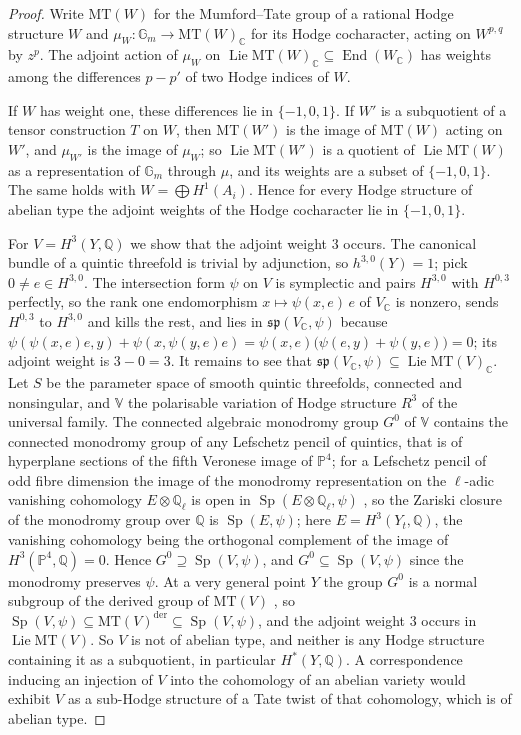 \documentclass[11pt,reqno]{amsart}
\theoremstyle{plain}
\theoremstyle{definition}
\theoremstyle{remark}
\newcommand{\QQ}{\mathbb{Q}}
\newcommand{\CC}{\mathbb{C}}
\newcommand{\PP}{\mathbb{P}}
\DeclareMathOperator{\End}{End}
\DeclareMathOperator{\Sp}{Sp}
\begin{document}
\begin{proof}
Write $\mathrm{MT}(W)$ for the Mumford--Tate group of a rational Hodge
structure $W$ and $\mu_{W}\colon\mathbb{G}_{m}\to\mathrm{MT}(W)_{\CC}$ for
its Hodge cocharacter, acting on $W^{p,q}$ by $z^{p}$. The adjoint action of
$\mu_{W}$ on $\operatorname{Lie}\mathrm{MT}(W)_{\CC}\subseteq\End(W_{\CC})$ has weights
among the differences $p-p'$ of two Hodge indices of $W$.

If $W$ has weight one, these differences lie in $\{-1,0,1\}$. If $W'$ is a
subquotient of a tensor construction $T$ on $W$, then $\mathrm{MT}(W')$ is the
image of $\mathrm{MT}(W)$ acting on $W'$, and $\mu_{W'}$ is the image of
$\mu_{W}$; so $\operatorname{Lie}\mathrm{MT}(W')$ is a quotient of $\operatorname{Lie}\mathrm{MT}(W)$
as a representation of $\mathbb{G}_{m}$ through $\mu$, and its weights are a
subset of $\{-1,0,1\}$. The same holds with $W=\bigoplus H^{1}(A_{i})$.
Hence for every Hodge structure of abelian type the adjoint weights of the
Hodge cocharacter lie in $\{-1,0,1\}$.

For $V=H^{3}(Y,\QQ)$ we show that the adjoint weight $3$ occurs. The
canonical bundle of a quintic threefold is trivial by adjunction, so
$h^{3,0}(Y)=1$; pick $0\ne e\in H^{3,0}$. The intersection form $\psi$ on $V$
is symplectic and pairs $H^{3,0}$ with $H^{0,3}$ perfectly, so the rank one
endomorphism $x\mapsto\psi(x,e)\,e$ of $V_{\CC}$ is nonzero, sends $H^{0,3}$
to $H^{3,0}$ and kills the rest, and lies in $\mathfrak{sp}(V_{\CC},\psi)$
because $\psi(\psi(x,e)e,y)+\psi(x,\psi(y,e)e)
=\psi(x,e)\bigl(\psi(e,y)+\psi(y,e)\bigr)=0$; its adjoint weight is
$3-0=3$. It remains to see that $\mathfrak{sp}(V_{\CC},\psi)\subseteq
\operatorname{Lie}\mathrm{MT}(V)_{\CC}$. Let $S$ be the parameter space of smooth quintic
threefolds, connected and nonsingular, and $\mathbb{V}$ the polarisable
variation of Hodge structure $R^{3}$ of the universal family. The connected
algebraic monodromy group $G^{0}$ of $\mathbb{V}$ contains the connected
monodromy group of any Lefschetz pencil of quintics, that is of hyperplane
sections of the fifth Veronese image of $\PP^{4}$; for a Lefschetz pencil of
odd fibre dimension the image of the monodromy representation on the
$\ell$-adic vanishing cohomology $E\otimes\QQ_{\ell}$ is open in
$\Sp(E\otimes\QQ_{\ell},\psi)$ \cite[Theorem 5.10]{Del74}, so the Zariski
closure of the monodromy group over $\QQ$ is $\Sp(E,\psi)$; here
$E=H^{3}(Y_{t},\QQ)$, the vanishing cohomology being the orthogonal
complement of the image of $H^{3}(\PP^{4},\QQ)=0$. Hence $G^{0}\supseteq
\Sp(V,\psi)$, and $G^{0}\subseteq\Sp(V,\psi)$ since the monodromy preserves
$\psi$. At a very general
point $Y$ the group $G^{0}$ is a normal subgroup of the derived group of
$\mathrm{MT}(V)$ \cite[Theorem 1]{And92}, so $\Sp(V,\psi)\subseteq
\mathrm{MT}(V)^{\mathrm{der}}\subseteq\Sp(V,\psi)$, and the adjoint weight
$3$ occurs in $\operatorname{Lie}\mathrm{MT}(V)$. So $V$ is not of abelian type, and
neither is any Hodge structure containing it as a subquotient, in particular
$H^{*}(Y,\QQ)$. A correspondence inducing an injection of $V$ into the
cohomology of an abelian variety would exhibit $V$ as a sub-Hodge structure
of a Tate twist of that cohomology, which is of abelian type.
\end{proof}
\end{document}
